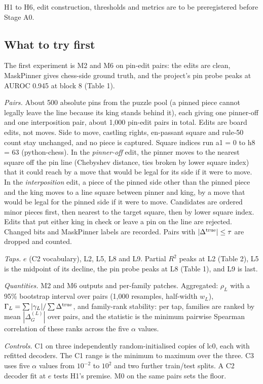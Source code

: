 \documentclass[conference]{IEEEtran}
\begin{document}
H1 to H6, edit construction, thresholds and metrics are to be preregistered before Stage A0.

\subsection{What to try first}\label{sec:10.5}
The first experiment is M2 and M6 on pin-edit pairs: the edits are clean, MaskPinner gives chess-side ground truth, and the project's pin probe peaks at AUROC 0.945 at block 8 (Table 1).

\emph{Pairs.} About 500 absolute pins from the puzzle pool (a pinned piece cannot legally leave the line because its king stands behind it), each giving one pinner-off and one interposition pair, about 1,000 pin-edit pairs in total. Edits are board edits, not moves. Side to move, castling rights, en-passant square and rule-50 count stay unchanged, and no piece is captured. Square indices run a1 = 0 to h8 = 63 (python-chess). In the \emph{pinner-off} edit, the pinner moves to the nearest square off the pin line (Chebyshev distance, ties broken by lower square index) that it could reach by a move that would be legal for its side if it were to move. In the \emph{interposition} edit, a piece of the pinned side other than the pinned piece and the king moves to a line square between pinner and king, by a move that would be legal for the pinned side if it were to move. Candidates are ordered minor pieces first, then nearest to the target square, then by lower square index. Edits that put either king in check or leave a pin on the line are rejected. Changed bits and MaskPinner labels are recorded. Pairs with $|\Delta^{\rm true}|\le\tau$ are dropped and counted.

\emph{Taps.} $e$ (C2 vocabulary), L2, L5, L8 and L9. Partial $R^2$ peaks at L2 (Table 2), L5 is the midpoint of its decline, the pin probe peaks at L8 (Table 1), and L9 is last.

\emph{Quantities.} M2 and M6 outputs and per-family patches. Aggregated: $\rho_L$ with a 95\% bootstrap interval over pairs (1,000 resamples, half-width $w_L$), $\Gamma_L=\sum|\gamma_L|/\sum\Delta^{\rm true}$, and family-rank stability: per tap, families are ranked by mean $|\Delta^{(L)}_G|$ over pairs, and the statistic is the minimum pairwise Spearman correlation of these ranks across the five $\alpha$ values.

\emph{Controls.} C1 on three independently random-initialised copies of lc0, each with refitted decoders. The C1 range is the minimum to maximum over the three. C3 uses five $\alpha$ values from $10^{-2}$ to $10^2$ and two further train/\allowbreak{}test splits. A C2 decoder fit at $e$ tests H1's premise. M0 on the same pairs sets the floor.
\end{document}
